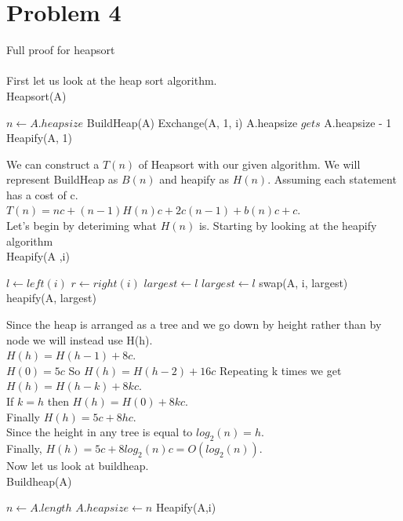 \documentclass{article}
\begin{document}
\section*{Problem 4}
Full proof for heapsort\\\\

First let us look at the heap sort algorithm.\\
Heapsort(A)
\begin{algorithmic}[1]
    \State $n \gets A.heapsize$
    \State BuildHeap(A)
        \State Exchange(A, 1, i)
        \State A.heapsize $gets $ A.heapsize - 1
        \State Heapify(A, 1)
\end{algorithmic}

We can construct a $T(n)$ of Heapsort with our given algorithm.
We will represent BuildHeap as $B(n)$ and heapify as $H(n)$.
Assuming each statement has a cost of c.\\

$T(n) = nc + (n-1)H(n)c + 2c(n - 1) + b(n)c + c$.\\

Let's begin by deteriming what $H(n)$ is. Starting by looking at the 
heapify algorithm\\

Heapify(A ,i)
\begin{algorithmic}[1]
    \State $l \gets left(i)$
    \State $r \gets right(i)$
        \state $largest \gets l$
        \state $largest \gets l$
        \state swap(A, i, largest)
        \state heapify(A, largest)
\end{algorithmic}

Since the heap is arranged as a tree and we go down by height 
rather than by node we will instead use H(h).\\
$H(h) = H(h - 1) + 8c$.\\
$H(0) = 5c$
So $H(h) = H(h - 2) + 16c$
Repeating k times we get $H(h) = H(h - k) + 8kc$.\\
If $k = h$ then $H(h) = H(0) + 8kc$.\\
Finally $H(h) = 5c + 8hc$.\\
Since the height in any tree is equal to $log_{2}(n) = h$.\\
Finally, $H(h) = 5c + 8log_{2}(n)c = O(log_{2}(n))$.\\
Now let us look at buildheap.\\
Buildheap(A)
\begin{algorithmic}[1]
    \State $n \gets A.length$
    \State $A.heapsize \gets n$
        \State Heapify(A,i)
\end{algorithmic}
\end{document}
